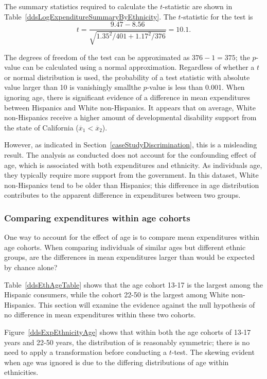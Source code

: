 The summary statistics required to calculate the $t$-statistic are shown in Table~\ref{ddsLogExpenditureSummaryByEthnicity}. The $t$-statistic for the test is 
\[t = \frac{9.47 - 8.56}{\sqrt{1.35^2/401 + 1.17^2/376}} = 10.1.\]

The degrees of freedom of the test can be approximated as $376 - 1 = 375$; the $p$-value can be calculated using a normal approximation. Regardless of whether a $t$ or normal distribution is used, the probability of a test statistic with absolute value larger than 10 is vanishingly small\textemdash the $p$-value is less than 0.001. When ignoring age, there is significant evidence of a difference in mean expenditures between Hispanics and White non-Hispanics. It appears that on average, White non-Hispanics receive a higher amount of developmental disability support from the state of California ($\overline{x}_1 < \overline{x}_2$).

However, as indicated in Section~\ref{caseStudyDiscrimination}, this is a misleading result. The analysis as conducted does not account for the confounding effect of age, which is associated with both expenditures and ethnicity. As individuals age, they typically require more support from the government. In this dataset, White non-Hispanics tend to be older than Hispanics; this difference in age distribution contributes to the apparent difference in expenditures between two groups.

\subsubsection{Comparing expenditures within age cohorts}

One way to account for the effect of age is to compare mean expenditures within age cohorts. When comparing individuals of similar ages but different ethnic groups, are the differences in mean expenditures larger than would be expected by chance alone? 

Table~\ref{ddsEthAgeTable} shows that the age cohort 13-17 is the largest among the Hispanic consumers, while the cohort 22-50 is the largest among White non-Hispanics. This section will examine the evidence against the null hypothesis of no difference in mean expenditures within these two cohorts.

Figure~\ref{ddsExpEthnicityAge} shows that within both the age cohorts of 13-17 years and 22-50 years, the distribution of  is reasonably symmetric; there is no need to apply a transformation before conducting a $t$-test. The skewing evident when age was ignored is due to the differing distributions of age within ethnicities. 

